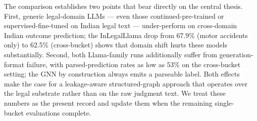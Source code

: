 \documentclass[runningheads]{llncs}
\begin{document}
The comparison establishes two points that bear directly on the central thesis. First, generic legal-domain LLMs --- even those continued-pre-trained or supervised-fine-tuned on Indian legal text --- under-perform on cross-domain Indian outcome prediction; the InLegalLlama drop from 67.9\% (motor accidents only) to 62.5\% (cross-bucket) shows that domain shift hurts these models substantially. Second, both Llama-family runs additionally suffer from generation-format failure, with parsed-prediction rates as low as 53\% on the cross-bucket setting; the GNN by construction always emits a parseable label. Both effects make the case for a leakage-aware structured-graph approach that operates over the legal substrate rather than on the raw judgment text. We treat these numbers as the present record and update them when the remaining single-bucket evaluations complete.




\end{document}
